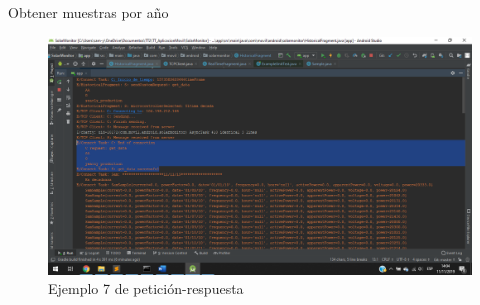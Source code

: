 Obtener muestras por año
\begin{figure}[H]
	\centering
	\includegraphics[scale=.4]{Capitulo5/images/connect16.png}
	\caption{Ejemplo 7 de petición-respuesta}	\label{fig:connect16}
\end{figure} 






